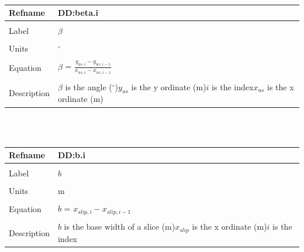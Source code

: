 \documentclass[12pt]{article}
\begin{document}
~\newline
\noindent \begin{minipage}{\textwidth}
\begin{tabular}{p{} p{}}
\toprule \textbf{Refname} & \textbf{DD:beta.i}
\label{DD:beta.i}
\\ \midrule \\
Label & $\beta{}$
\\ \midrule \\
Units & ${}^{\circ}$
\\ \midrule \\
Equation & $\beta{}$ = $\frac{y_{us,i}-y_{us,i-1}}{x_{us,i}-x_{us,i-1}}$
\\ \midrule \\
Description & $\beta{}$ is the angle (${}^{\circ}$)\newline$y_{us}$ is the y ordinate (m)\newline$i$ is the index\newline$x_{us}$ is the x ordinate (m)
\\ \bottomrule \end{tabular}
\end{minipage}\\
~\newline
\noindent \begin{minipage}{\textwidth}
\begin{tabular}{p{} p{}}
\toprule \textbf{Refname} & \textbf{DD:b.i}
\label{DD:b.i}
\\ \midrule \\
Label & $b$
\\ \midrule \\
Units & m
\\ \midrule \\
Equation & $b$ = $x_{slip,i}-x_{slip,i-1}$
\\ \midrule \\
Description & $b$ is the base width of a slice (m)\newline$x_{slip}$ is the x ordinate (m)\newline$i$ is the index
\\ \bottomrule \end{tabular}
\end{minipage}\\
~\newline
\end{document}
